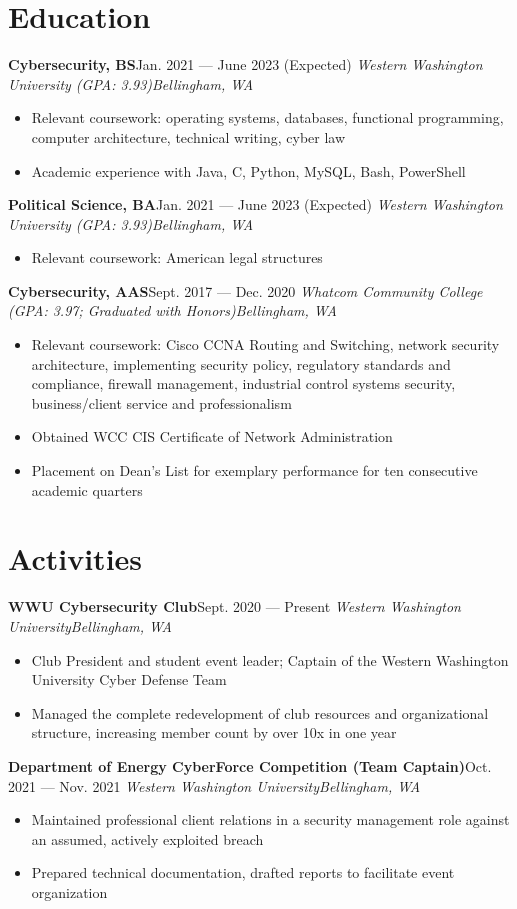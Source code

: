 \documentclass{article}
\newcommand{\topLevelItem}[4]{
    \textbf{#1}\hfill #4\newline
    \emph{#2\hfill #3}\newline
    \vspace{-18pt}\begin{itemize}
}
\newcommand{\topLevelItemEnd}{\end{itemize}\vspace{5pt}}
\newcommand{\lowLevelItem}[1]{
    \item\small{#1}\vspace{-8pt}
}
\begin{document}
    \section*{Education}
        \topLevelItem{Cybersecurity, BS}{Western Washington University (GPA: 3.93)}{Bellingham, WA}{Jan. 2021 — June 2023 (Expected)}
            \lowLevelItem{Relevant coursework: operating systems, databases, functional programming, computer architecture, technical writing, cyber law}
            \lowLevelItem{Academic experience with Java, C, Python, MySQL, Bash, PowerShell}
        \topLevelItemEnd
        \topLevelItem{Political Science, BA}{Western Washington University (GPA: 3.93)}{Bellingham, WA}{Jan. 2021 — June 2023 (Expected)}
            \lowLevelItem{Relevant coursework: American legal structures}
        \topLevelItemEnd
        \topLevelItem{Cybersecurity, AAS}{Whatcom Community College (GPA: 3.97; Graduated with Honors)}{Bellingham, WA}{Sept. 2017 — Dec. 2020}
            \lowLevelItem{Relevant coursework: Cisco CCNA Routing and Switching, network security architecture, implementing security policy, regulatory standards and compliance, firewall management, industrial control systems security, business/client service and professionalism}
            \lowLevelItem{Obtained WCC CIS Certificate of Network Administration}
            \lowLevelItem{Placement on Dean’s List for exemplary performance for ten consecutive academic quarters}
        \topLevelItemEnd
        
    \section*{Activities}
        \topLevelItem{WWU Cybersecurity Club}{Western Washington University}{Bellingham, WA}{Sept. 2020 — Present}
            \lowLevelItem{Club President and student event leader; Captain of the Western Washington University Cyber Defense Team}
            \lowLevelItem{Managed the complete redevelopment of club resources and organizational structure, increasing member count by over 10x in one year}
        \topLevelItemEnd
        \topLevelItem{Department of Energy CyberForce Competition (Team Captain)}{Western Washington University}{Bellingham, WA}{Oct. 2021 — Nov. 2021}
            \lowLevelItem{Maintained professional client relations in a security management role against an assumed, actively exploited breach}
            \lowLevelItem{Prepared technical documentation, drafted reports to facilitate event organization}
        \topLevelItemEnd
        
\end{document}
